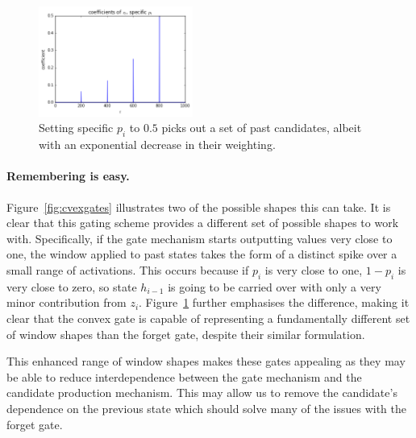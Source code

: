 \begin{figure}[tbp]
\centering
\includegraphics[width=0.45\textwidth]{newarchs/cvextrain}
\caption[Convex gate choosing several past candidates]
{Setting specific \(p_i\) to \(0.5\) picks out a set of past candidates, albeit with
an exponential decrease in their weighting.}
\label{fig:cvextrain}
\end{figure}

\paragraph{Remembering is easy.}
Figure~\ref{fig:cvexgates} illustrates two of the possible shapes this can take. It is clear
that this gating scheme provides a different set of possible shapes to work with.
Specifically, if the gate mechanism starts outputting values very close to one, the window
applied to past states takes the form of a distinct spike over a small range of activations.
This occurs because if \(p_i\) is very close to one, \(1 - p_i\) is very close to zero, so
state \(h_{i-1}\) is going to be carried over with only a very minor contribution from
\(z_i\). Figure~\ref{fig:cvextrain} further emphasises the difference, making it clear that
the convex gate is capable of representing a fundamentally different set of window shapes
than the forget gate, despite their similar formulation.

This enhanced range of window shapes makes these gates appealing as they may be able to reduce
interdependence between the gate mechanism and the candidate production mechanism. This may
allow us to remove the candidate's dependence on the previous state which should solve many of the
issues with the forget gate.

